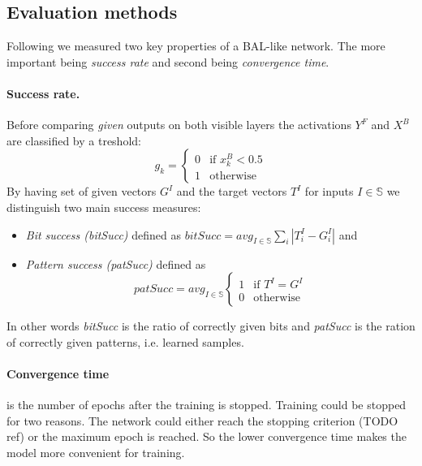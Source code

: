 
\subsection{Evaluation methods} 
\label{sec:sim-evaluation} 

Following \citet{farkas2013bal} we measured two key properties of a BAL-like network. The more important being \emph{success rate} and second being \emph{convergence time}. 

\paragraph{Success rate.}  
Before comparing \emph{given} outputs on both visible layers the activations $Y^F$ and $X^B$ are classified by a treshold: 
\begin{equation} 
  g_k =
  \left\{
	  \begin{array}{ll}
		  0 & \mbox{if } x_k^B < 0.5 \\
		  1 & \mbox{otherwise}
	  \end{array}
  \right.  
\end{equation} 
By having set of given vectors $G^I$ and the target vectors $T^I$ for inputs $I \in \mathbb{S}$ we distinguish two main success measures: 
\begin{itemize}
  \item \emph{Bit success (bitSucc)} defined as $bitSucc = avg_{I \in \mathbb{S}} \sum_i |T_i^I - G^I_i|$ and 
  \item \emph{Pattern success (patSucc)} defined as 
    \begin{equation}
      patSucc = avg_{I \in \mathbb{S}} \left\{
	      \begin{array}{ll}
		      1 & \mbox{if } T^I = G^I \\
		      0 & \mbox{otherwise}
	      \end{array}
      \right.
    \end{equation} 
\end{itemize} 
In other words \emph{bitSucc} is the ratio of correctly given bits and \emph{patSucc} is the ration of correctly given patterns, i.e. learned samples. 

\paragraph{Convergence time} is the number of epochs after the training is stopped. Training could be stopped for two reasons. The network could either reach the stopping criterion (TODO ref) or the maximum epoch is reached. So the lower convergence time makes the model more convenient for training.  

